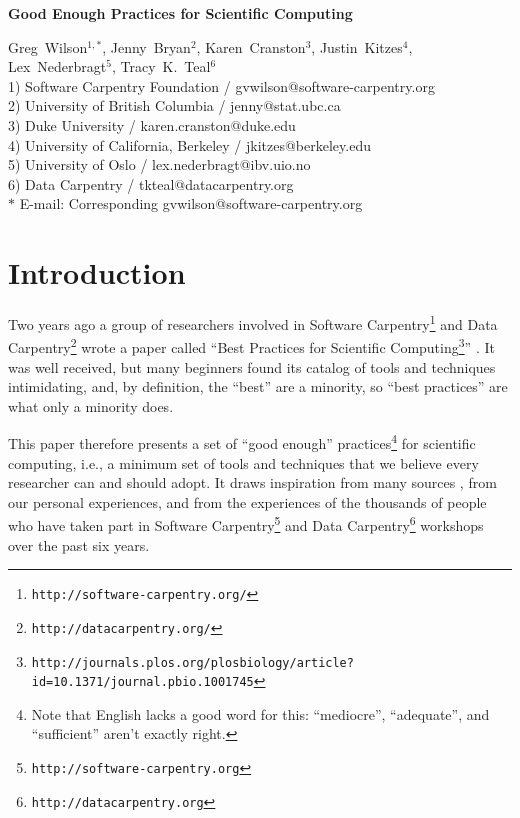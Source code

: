 \documentclass[10pt]{article}
\date{}
\newcommand{\withurl}[2]{{#1}\footnote{\texttt{#2}}}
\begin{document}
\begin{flushleft}
{\Large
\textbf{Good Enough Practices for Scientific Computing}
}

{Greg~Wilson}$^{1,\ast}$,
{Jenny~Bryan}$^{2}$,
{Karen~Cranston}$^{3}$,
{Justin~Kitzes}$^{4}$,
{Lex~Nederbragt}$^{5}$,
{Tracy~K.~Teal}$^{6}$
\\
1) Software Carpentry Foundation / gvwilson@software-carpentry.org
\\
2) University of British Columbia / jenny@stat.ubc.ca
\\
3) Duke University / karen.cranston@duke.edu
\\
4) University of California, Berkeley / jkitzes@berkeley.edu
\\
5) University of Oslo / lex.nederbragt@ibv.uio.no
\\
6) Data Carpentry / tkteal@datacarpentry.org
\\
$\ast$ E-mail: Corresponding gvwilson@software-carpentry.org
\end{flushleft}

\section{Introduction}\label{sec:introduction}

Two years ago a group of researchers involved in \withurl{Software
  Carpentry}{http://software-carpentry.org/} and \withurl{Data
  Carpentry}{http://datacarpentry.org/} wrote a paper called
``\withurl{Best Practices for Scientific
  Computing}{http://journals.plos.org/plosbiology/article?id=10.1371/journal.pbio.1001745}''
\cite{wilson2014}. It was well received, but many beginners found its
catalog of tools and techniques intimidating, and, by definition, the
``best'' are a minority, so ``best practices'' are what only a
minority does.

This paper therefore presents a set of ``good enough''
practices\footnote{Note that English lacks a good word for this:
  ``mediocre'', ``adequate'', and ``sufficient'' aren't exactly
  right.} for scientific computing, i.e., a minimum set of tools and
techniques that we believe every researcher can and should adopt. It
draws inspiration from many sources
\cite{gentzkow2014,noble2009,brown2015,wickham2014,kitzes2016,sandve2013,hart2015},
from our personal experiences, and from the experiences of the
thousands of people who have taken part in \withurl{Software
  Carpentry}{http://software-carpentry.org} and \withurl{Data
  Carpentry}{http://datacarpentry.org} workshops over the past six
years.
\end{document}
